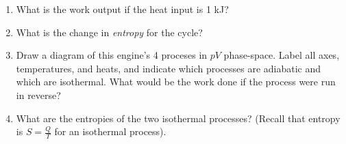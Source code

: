 \documentclass[10pt]{article}
\begin{document}
\begin{enumerate}
\begin{enumerate}
\item What is the work output if the heat input is 1 kJ? \\ \vspace{2cm}
\item What is the change in \textit{entropy} for the cycle? \\ \vspace{2cm}
\item Draw a diagram of this engine's 4 proceses in $pV$ phase-space.  Label all axes, temperatures, and heats, and indicate which processes are adiabatic and which are isothermal. What would be the work done if the process were run in reverse? \\ \vspace{4cm}
\item What are the entropies of the two isothermal processes? (Recall that entropy is $S = \frac{Q}{T}$ for an isothermal process).
\end{enumerate}
\end{enumerate}
\end{document}
